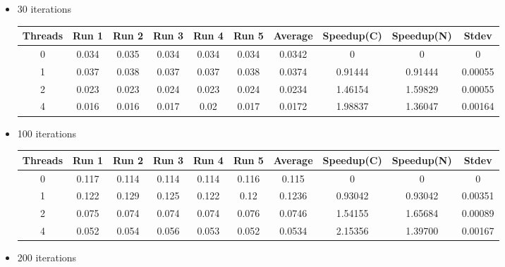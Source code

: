  \begin{itemize}
\item 30 iterations
\begin{center}
 \begin{adjustbox}{width=\columnwidth, center} 
 \begin{tabular}{ | |c | c c c c c | c | c c | c | |} \hline 
 Threads & Run 1 & Run 2 & Run 3 & Run 4 & Run 5 & Average & Speedup(C) & Speedup(N) & Stdev \\ [0.5ex] 
 \hline 
 \hline 
0& 0.034 & 0.035 & 0.034 & 0.034 & 0.034 & 0.0342 & 0 & 0 & 0\\ 
 \hline
1& 0.037 & 0.038 & 0.037 & 0.037 & 0.038 & 0.0374 & 0.91444 & 0.91444 & 0.00055\\ 
 \hline
2& 0.023 & 0.023 & 0.024 & 0.023 & 0.024 & 0.0234 & 1.46154 & 1.59829 & 0.00055\\ 
 \hline
4& 0.016 & 0.016 & 0.017 & 0.02 & 0.017 & 0.0172 & 1.98837 & 1.36047 & 0.00164\\ 
 \hline
\end{tabular} \end{adjustbox} \end{center}\item 100 iterations
\begin{center}
 \begin{adjustbox}{width=\columnwidth, center} 
 \begin{tabular}{ | |c | c c c c c | c | c c | c | |} \hline 
 Threads & Run 1 & Run 2 & Run 3 & Run 4 & Run 5 & Average & Speedup(C) & Speedup(N) & Stdev \\ [0.5ex] 
 \hline 
 \hline 
0& 0.117 & 0.114 & 0.114 & 0.114 & 0.116 & 0.115 & 0 & 0 & 0\\ 
 \hline
1& 0.122 & 0.129 & 0.125 & 0.122 & 0.12 & 0.1236 & 0.93042 & 0.93042 & 0.00351\\ 
 \hline
2& 0.075 & 0.074 & 0.074 & 0.074 & 0.076 & 0.0746 & 1.54155 & 1.65684 & 0.00089\\ 
 \hline
4& 0.052 & 0.054 & 0.056 & 0.053 & 0.052 & 0.0534 & 2.15356 & 1.39700 & 0.00167\\ 
 \hline
\end{tabular} \end{adjustbox} \end{center}\item 200 iterations
\begin{center}
 \begin{adjustbox}{width=\columnwidth, center} 
 \begin{tabular}{ | |c | c c c c c | c | c c | c | |} \hline 

\end{tabular}
\end{adjustbox}
\end{center}
\end{itemize}
